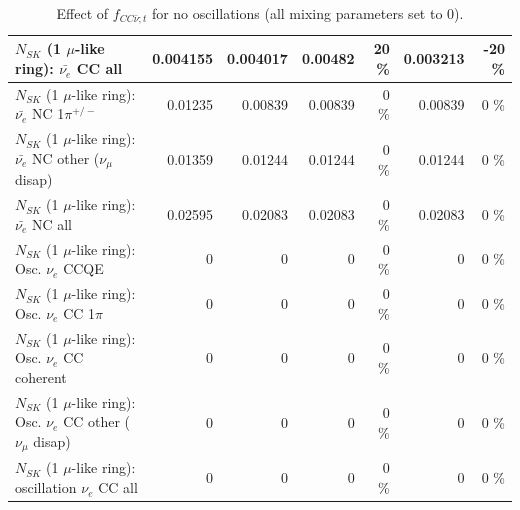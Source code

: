 \begin{table}
\begin{tabular}{| l | r | r | r  r | r  r |}
                            $N_{SK}$ (1 $\mu$-like ring): $\bar{\nu_{e}}$ CC all &        0.004155 &        0.004017 &         0.00482 &       20 \%  &        0.003213 &      -20 \%  \\ 
\hline
                     $N_{SK}$ (1 $\mu$-like ring): $\bar{\nu_e}$ NC 1$\pi^{+/-}$ &         0.01235 &         0.00839 &         0.00839 &        0 \%  &         0.00839 &        0 \%  \\ 
          $N_{SK}$ (1 $\mu$-like ring): $\bar{\nu_e}$ NC other ($\nu_\mu$ disap) &         0.01359 &         0.01244 &         0.01244 &        0 \%  &         0.01244 &        0 \%  \\ 
                            $N_{SK}$ (1 $\mu$-like ring): $\bar{\nu_{e}}$ NC all &         0.02595 &         0.02083 &         0.02083 &        0 \%  &         0.02083 &        0 \%  \\ 
\hline
\hline
\hline
                                 $N_{SK}$ (1 $\mu$-like ring): Osc. $\nu_e$ CCQE &               0 &               0 &               0 &        0 \%  &               0 &        0 \%  \\ 
                            $N_{SK}$ (1 $\mu$-like ring): Osc. $\nu_e$ CC 1$\pi$ &               0 &               0 &               0 &        0 \%  &               0 &        0 \%  \\ 
                          $N_{SK}$ (1 $\mu$-like ring): Osc. $\nu_e$ CC coherent &               0 &               0 &               0 &        0 \%  &               0 &        0 \%  \\ 
           $N_{SK}$ (1 $\mu$-like ring): Osc. $\nu_e$ CC other ($\nu_\mu$ disap) &               0 &               0 &               0 &        0 \%  &               0 &        0 \%  \\ 
                        $N_{SK}$ (1 $\mu$-like ring): oscillation $\nu_e$ CC all &               0 &               0 &               0 &        0 \%  &               0 &        0 \%  \\ 
\hline
\hline
\end{tabular}
\caption{ Effect of $f_{CC\bar{\nu}; t}$ for no oscillations (all mixing parameters set to 0). }
\label{tab:num_xsec_norm_antinutonu_1RmuT_3f_osc_t13:0}
\end{table}
\clearpage
